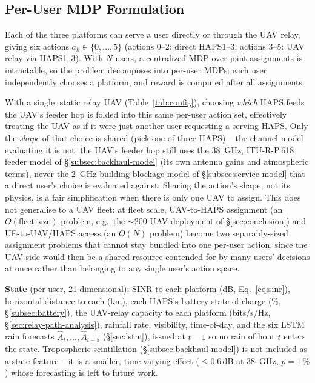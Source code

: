 \documentclass[]{ieeeaccess}
\begin{document}
\subsection{Per-User MDP Formulation}

Each of the three platforms can serve a user directly or through the UAV relay, giving six actions $a_k\in\{0,\dots,5\}$ (actions 0--2: direct HAPS1--3; actions 3--5: UAV relay via HAPS1--3). With $N$ users, a centralized MDP over joint assignments is intractable, so the problem decomposes into per-user MDPs: each user independently chooses a platform, and reward is computed after all assignments.

With a single, static relay UAV (Table~\ref{tab:config}), choosing \emph{which} HAPS feeds the UAV's feeder hop is folded into this same per-user action set, effectively treating the UAV as if it were just another user requesting a serving HAPS. Only the \emph{shape} of that choice is shared (pick one of three HAPS) -- the channel model evaluating it is not: the UAV's feeder hop still uses the 38~GHz, ITU-R-P.618 feeder model of \S\ref{subsec:backhaul-model} (its own antenna gains and atmospheric terms), never the 2~GHz building-blockage model of \S\ref{subsec:service-model} that a direct user's choice is evaluated against. Sharing the action's shape, not its physics, is a fair simplification when there is only one UAV to assign. This does not generalise to a UAV fleet: at fleet scale, UAV-to-HAPS assignment (an $O(\text{fleet size})$ problem, e.g.\ the $\sim$200-UAV deployment of \S\ref{sec:conclusion}) and UE-to-UAV/HAPS access (an $O(N)$ problem) become two separably-sized assignment problems that cannot stay bundled into one per-user action, since the UAV side would then be a shared resource contended for by many users' decisions at once rather than belonging to any single user's action space.

\textbf{State} (per user, 21-dimensional): SINR to each platform (dB, Eq.~\eqref{eq:sinr}), horizontal distance to each (km), each HAPS's battery state of charge (\%, \S\ref{subsec:battery}), the UAV-relay capacity to each platform (bits/s/Hz, \S\ref{sec:relay-path-analysis}), rainfall rate, visibility, time-of-day, and the six LSTM rain forecasts $\hat{A}_t,\dots,\hat{A}_{t+5}$ (\S\ref{sec:lstm}), issued at $t-1$ so no rain of hour $t$ enters the state. Tropospheric scintillation (\S\ref{subsec:backhaul-model}) is not included as a state feature -- it is a smaller, time-varying effect ($\le$0.6\,dB at 38~GHz, $p=1\,\%$) whose forecasting is left to future work.
\end{document}

